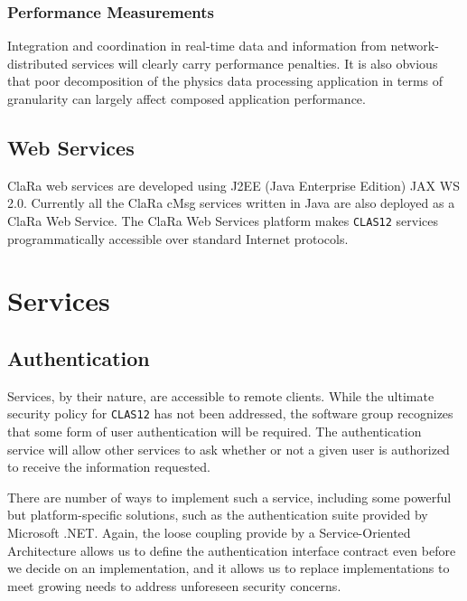\subsubsection{Performance Measurements}

Integration and coordination in real-time data and information from 
network-distributed services will clearly carry performance penalties.  It 
is also obvious that poor decomposition of the physics data processing 
application in terms of granularity can largely affect composed application 
performance.   

 
\subsection{Web Services}

ClaRa web services are developed using J2EE (Java Enterprise Edition) JAX 
WS 2.0.  Currently all the ClaRa cMsg services written in Java are also 
deployed as a ClaRa Web Service.  The ClaRa Web Services platform makes 
{\tt CLAS12} services programmatically accessible over standard Internet 
protocols.

\section{Services}

\subsection{Authentication}

Services, by their nature, are accessible to remote clients. While the 
ultimate security policy for {\tt CLAS12} has not been addressed, the 
software group recognizes that some form of user authentication will be 
required. The authentication service will allow other services to ask 
whether or not a given user is authorized to receive the information  
requested.

There are number of ways to implement such a service, including some 
powerful but platform-specific solutions, such as the authentication suite 
provided by Microsoft .NET. Again, the loose coupling provide by a 
Service-Oriented Architecture allows us to define the authentication 
interface contract even before we decide on an implementation, and it 
allows us to replace implementations to meet growing needs to address 
unforeseen security concerns.


